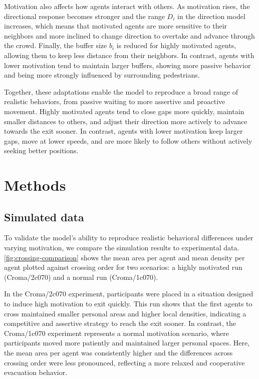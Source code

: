 \documentclass[pdflatex,sn-mathphys-num]{sn-jnl}%
\theoremstyle{thmstyleone}%
\theoremstyle{thmstyletwo}%
\theoremstyle{thmstylethree}%
\begin{document}
Motivation also affects how agents interact with others. As motivation rises, the directional response becomes stronger and the range \( D_i \) in the direction model increases, which means that motivated agents are more sensitive to their neighbors and more inclined to change direction to overtake and advance through the crowd. 
Finally, the buffer size \( b_i \) is reduced for highly motivated agents, allowing them to keep less distance from their neighbors. 
In contrast, agents with lower motivation tend to maintain larger buffers, showing more passive behavior and being more strongly influenced by surrounding pedestrians.

Together, these adaptations enable the model to reproduce a broad range of realistic behaviors, from passive waiting to more assertive and proactive movement. 
Highly motivated agents tend to close gaps more quickly, maintain smaller distances to others, and adjust their direction more actively to advance towards the exit sooner. 
In contrast, agents with lower motivation keep larger gaps, move at lower speeds, and are more likely to follow others without actively seeking better positions. 

\section{Methods}
\label{sec:methods}
\subsection{Simulated data}
To validate the model's ability to reproduce realistic behavioral differences under varying motivation, we compare the simulation results to experimental data. 
\cref{fig:crossing-comparison} shows the mean area per agent and mean density per agent plotted against crossing order for two scenarios: a highly motivated run (Croma/2c070) and a normal run (Croma/1c070). 

In the Croma/2c070 experiment, participants were placed in a situation designed to induce high motivation to exit quickly. This run shows that the first agents to cross maintained smaller personal areas and higher local densities, indicating a competitive and assertive strategy to reach the exit sooner. In contrast, the Croma/1c070 experiment represents a normal motivation scenario, where participants moved more patiently and maintained larger personal spaces. Here, the mean area per agent was consistently higher and the differences across crossing order were less pronounced, reflecting a more relaxed and cooperative evacuation behavior.
\end{document}
